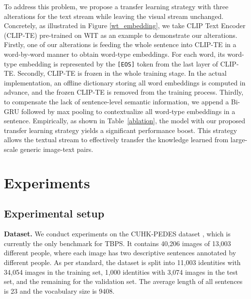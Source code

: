 \documentclass{bmvc2k}
\newcommand{\statement}[1]{\noindent\textbf{#1}}
\begin{document}
To address this problem, we propose a transfer learning strategy with three alterations for the text stream while leaving the visual stream unchanged. 
Concretely, as illustrated in Figure \ref{wt_embedding}, we take CLIP Text Encoder (CLIP-TE) \cite{radford2021clip} pre-trained on WIT as an example to demonstrate our alterations. 
Firstly, one of our alterations is feeding the whole sentence into CLIP-TE in a word-by-word manner to obtain word-type embeddings. 
For each word, its word-type embedding is represented by the \texttt{[EOS]} token from the last layer of CLIP-TE. 
Secondly, CLIP-TE is frozen in the whole training stage. 
In the actual implementation, an offline dictionary storing all word embeddings is computed in advance, and the frozen CLIP-TE is removed from the training process. 
Thirdly, to compensate the lack of sentence-level semantic information, we append a Bi-GRU \cite{cho2014gru} followed by max pooling to contextualize all word-type embeddings in a sentence. 
Empirically, as shown in Table~\ref{ablation}, the model with our proposed transfer learning strategy yields a significant performance boost. 
This strategy allows the textual stream to effectively transfer the knowledge learned from large-scale generic image-text pairs.
 \vspace*{-3mm}
\section{Experiments}
\subsection{Experimental setup}
\statement{Dataset.} We conduct experiments on the CUHK-PEDES dataset \cite{li2017person}, which is currently the only benchmark for TBPS. 
It contains 40,206 images of 13,003 different people, where each image has two descriptive sentences annotated by different people. 
As per standard, the dataset is split into 11,003 identities with 34,054 images in the training set, 1,000 identities with 3,074 images in the test set, and the remaining for the validation set. 
The average length of all sentences is 23 and the vocabulary size is 9408.
\end{document}
